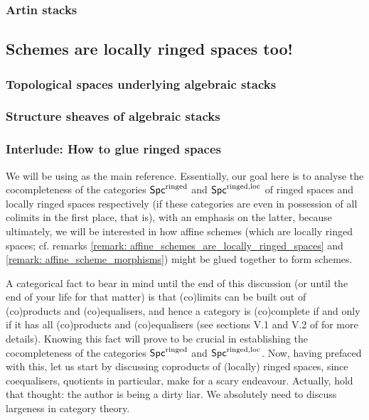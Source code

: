             \subsubsection{Artin stacks}
                
            
        \subsection{Schemes are locally ringed spaces too!}
            \subsubsection{Topological spaces underlying algebraic stacks}
            
            \subsubsection{Structure sheaves of algebraic stacks}
            
            \subsubsection{Interlude: How to glue ringed spaces}
                We will be using \cite{schwede_gluing} as the main reference. Essentially, our goal here is to analyse the cocompleteness of the categories $\mathsf{Spc}^{\mathrm{ringed}}$ and $\mathsf{Spc}^{\mathrm{ringed}, \mathrm{loc}}$ of ringed spaces and locally ringed spaces respectively (if these categories are even in possession of all colimits in the first place, that is), with an emphasis on the latter, because ultimately, we will be interested in how affine schemes (which are locally ringed spaces; cf. remarks \ref{remark: affine_schemes_are_locally_ringed_spaces} and \ref{remark: affine_scheme_morphisms}) might be glued together to form schemes. 
                
                A categorical fact to bear in mind until the end of this discussion (or until the end of your life for that matter) is that (co)limits can be built out of (co)products and (co)equalisers, and hence a category is (co)complete if and only if it has all (co)products and (co)equalisers (see sections V.1 and V.2 of \cite{maclane} for more details). Knowing this fact will prove to be crucial in establishing the cocompleteness of the categories $\mathsf{Spc}^{\mathrm{ringed}}$ and $\mathsf{Spc}^{\mathrm{ringed}, \mathrm{loc}}$. Now, having prefaced with this, let us start by discussing coproducts of (locally) ringed spaces, since coequalisers, quotients in particular, make for a scary endeavour. Actually, hold that thought: the author is being a dirty liar. We absolutely need to discuss largeness in category theory.
                
